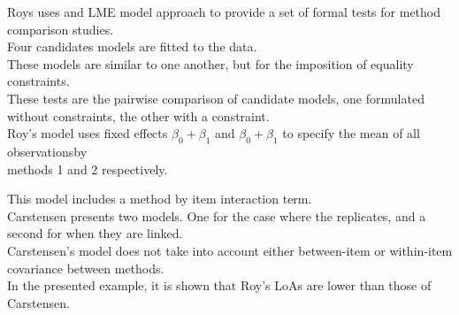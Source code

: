\documentclass[12pt, a4paper]{report}
\theoremstyle{plain}
\theoremstyle{definition}
\theoremstyle{remark}
\begin{document}








Roys uses and LME model approach to provide a set of formal tests for method comparison studies.\\

Four candidates models are fitted to the data.\\

These models are similar to one another, but for the imposition of equality constraints.\\

These tests are the pairwise comparison of candidate models, one formulated without constraints, the other with a constraint.\\


Roy's model uses fixed effects $\beta_0 + \beta_1$ and $\beta_0 + \beta_1$ to specify the mean of all observationsby \\ methods 1 and 2 respectively.


This model includes a method by item interaction term.\\

Carstensen presents two models. One for the case where the replicates, and a second for when they are linked.\\
Carstensen's model does not take into account either between-item or within-item covariance between methods.\\
In the presented example, it is shown that Roy's LoAs are lower than those of Carstensen.
\end{document}
